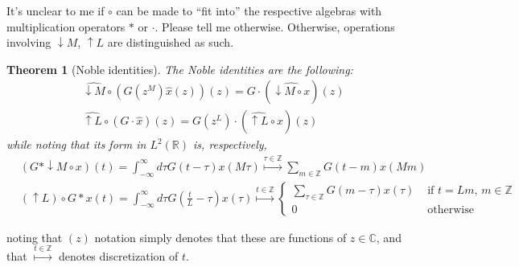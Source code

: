 \documentclass[twoside]{amsart}
\theoremstyle{plain}
\newtheorem{theorem}{Theorem}
\theoremstyle{definition}
\theoremstyle{remark}
\numberwithin{equation}{section}
\begin{document}
It's unclear to me if $\circ$ can be made to ``fit into'' the respective algebras with multiplication operators $*$ or $\cdot$.  Please tell me otherwise.  Otherwise, operations involving $\downarrow M$, $\uparrow L$ are distinguished as such.  

\begin{theorem}[Noble identities]
The Noble identities are the following:
 \begin{align}
  & \boxed{ \widehat{\downarrow M} \circ (G(z^M)\widehat{x}(z) )(z) = G\cdot (\widehat{ \downarrow M \circ x })(z) } \\
  & \boxed{ \widehat{\uparrow L} \circ (G \cdot \widehat{x})(z) = G(z^L)\cdot (\widehat{\uparrow L}\circ x )(z) }
\end{align}
while noting that its form in $L^2(\mathbb{R})$ is, respectively,
\begin{align}
  & (G * \downarrow M\circ x)(t) = \int_{-\infty}^{\infty} d\tau G(t-\tau) x(M\tau) \overset{ \tau \in \mathbb{Z} }{\mapsto } \sum_{m\in \mathbb{Z}} G(t-m)x(Mm) \\
  &  (\uparrow L) \circ G*x(t)  = \int_{-\infty}^{\infty} d\tau G\left( \frac{t}{L} - \tau \right)x(\tau) \overset{ t\in \mathbb{Z}}{\mapsto} \begin{cases} 
    \sum_{\tau \in \mathbb{Z}} G(m-\tau)x(\tau) & \text{ if } t = Lm, \, m \in \mathbb{Z} \\
    0 & \text{ otherwise }
\end{cases}
\end{align}
\end{theorem}
noting that $(z)$ notation simply denotes that these are functions of $z \in \mathbb{C}$, and that $\overset{t\in \mathbb{Z}}{\mapsto}$ denotes discretization of $t$.    
\end{document}
